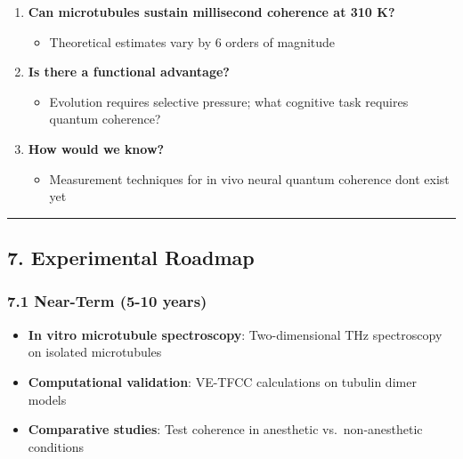 \begin{enumerate}
\def\labelenumi{\arabic{enumi}.}
\tightlist
\item
  \textbf{Can microtubules sustain millisecond coherence at 310 K?}

  \begin{itemize}
  \tightlist
  \item
    Theoretical estimates vary by 6 orders of magnitude
  \end{itemize}
\item
  \textbf{Is there a functional advantage?}

  \begin{itemize}
  \tightlist
  \item
    Evolution requires selective pressure; what cognitive task requires
    quantum coherence?
  \end{itemize}
\item
  \textbf{How would we know?}

  \begin{itemize}
  \tightlist
  \item
    Measurement techniques for in vivo neural quantum coherence
    don\textquotesingle t exist yet
  \end{itemize}
\end{enumerate}

\begin{center}\rule{0.5\linewidth}{0.5pt}\end{center}

\subsection{7. Experimental Roadmap}\label{experimental-roadmap}

\subsubsection{7.1 Near-Term (5-10 years)}\label{near-term-5-10-years}

\begin{itemize}
\tightlist
\item
  \textbf{In vitro microtubule spectroscopy}: Two-dimensional THz
  spectroscopy on isolated microtubules
\item
  \textbf{Computational validation}: VE-TFCC calculations on tubulin
  dimer models
\item
  \textbf{Comparative studies}: Test coherence in anesthetic
  vs.~non-anesthetic conditions
\end{itemize}

